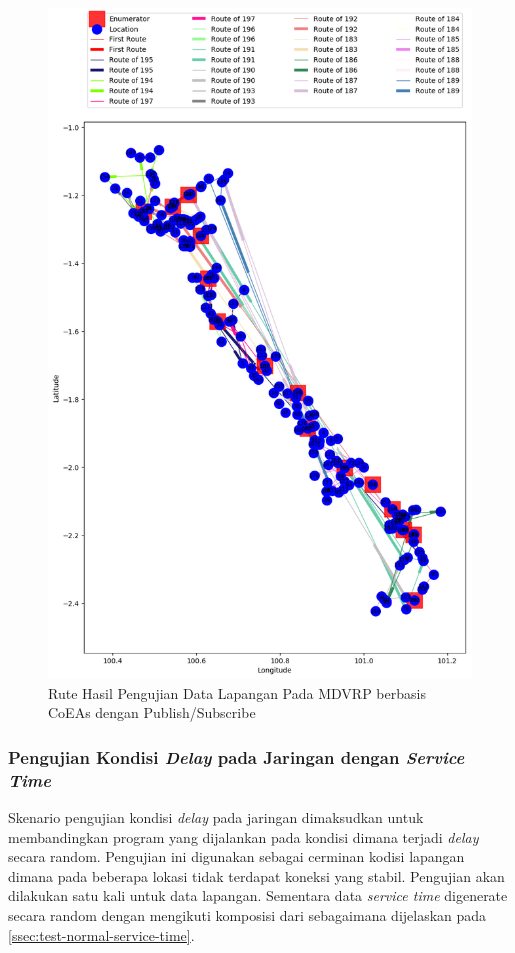 \begin{figure}[H]
	\centering
	\includegraphics[width=\textwidth]{Resources/Images/test_result_normal_field_m15_n182_pubsub_coes}
	\caption{Rute Hasil Pengujian Data Lapangan Pada MDVRP berbasis CoEAs dengan Publish/Subscribe}
	\label{fig:test_result_normal_field_pubsub_coes}
\end{figure}


\subsubsection{Pengujian Kondisi \textit{Delay} pada Jaringan dengan \textit{Service Time}}
Skenario pengujian kondisi \textit{delay} pada jaringan dimaksudkan untuk membandingkan program yang dijalankan pada kondisi dimana terjadi \textit{delay} secara random. Pengujian ini digunakan sebagai cerminan kodisi lapangan dimana pada beberapa lokasi tidak terdapat koneksi yang stabil. Pengujian akan dilakukan satu kali untuk data lapangan. Sementara data \textit{service time} digenerate secara random dengan mengikuti komposisi dari \citep{sudman_time_1965} sebagaimana dijelaskan pada \autoref{ssec:test-normal-service-time}.


